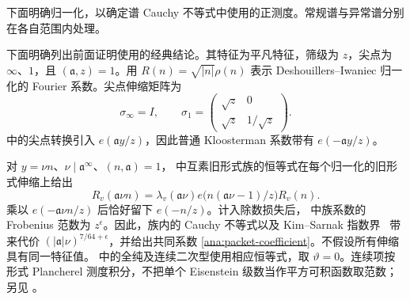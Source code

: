 下面明确归一化，以确定谱 Cauchy 不等式中使用的正测度。常规谱与异常谱分别在各自范围内处理。

下面明确列出前面证明使用的经典结论。其特征为平凡特征，筛级为 $z$，尖点为 $\infty$、$1$，且 $(\mathfrak{a},z)=1$。用 $R(n)=\sqrt{|n|}\rho(n)$ 表示 Deshouillers--Iwaniec 归一化的 Fourier 系数。尖点伸缩矩阵为
\[
 \sigma_\infty=I,\qquad
 \sigma_1=\begin{pmatrix}\sqrt z&0\\\sqrt z&1/\sqrt z\end{pmatrix}.
\]
\cite[Lemma 4.3]{Drappeau} 中的尖点转换引入 $e(\mathfrak{a}y/z)$，因此普通 Kloosterman 系数带有 $e(-\mathfrak{a}y/z)$。

对 $y=\nu n$、$\nu\mid \mathfrak{a}^\infty$、$(n,\mathfrak{a})=1$，\cite[Lemmas 3.1 及 3.2]{ABL} 中互素旧形式族的恒等式在每个归一化的旧形式伸缩上给出
\[
 R_v(\mathfrak{a}\nu n)=\lambda_v(\mathfrak{a}\nu)
                   e\bigl(n(\mathfrak{a}\nu-1)/z\bigr)R_v(n).
\]
乘以 $e(-\mathfrak{a}\nu n/z)$ 后恰好留下 $e(-n/z)$。计入除数损失后，\cite[(3.3)]{ABL} 中族系数的 Frobenius 范数为 $z^\epsilon$。因此，族内的 Cauchy 不等式以及 Kim--Sarnak 指数界~\cite{KimSarnak} 带来代价 $(|\mathfrak{a}|\nu)^{7/64+\epsilon}$，并给出共同系数 \eqref{ana:packet-coefficient}。不假设所有伸缩具有同一特征值。\cite[Lemma 3.2]{ABL} 中的全纯及连续二次型使用相应恒等式，取 $\vartheta=0$。连续项按形式 Plancherel 测度积分，不把单个 Eisenstein 级数当作平方可积函数取范数；另见 \cite[Proposition 8.2]{Young}。

